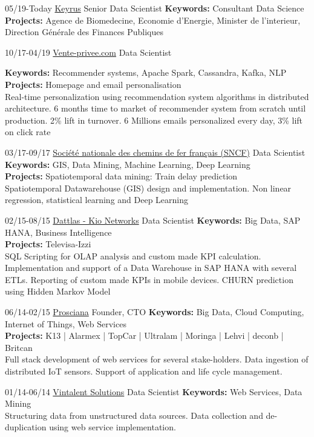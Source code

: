 \documentclass[]{friggeri-cv}
\begin{document}
\begin{entrylist}
\entry
{05/19-Today}
{\href{https://www.keyrus.com/}{Keyrus}}
{Senior Data Scientist} 
{\textbf{Keywords:} Consultant Data Science\\
	\textbf{Projects:} Agence de Biomedecine, Economie d'Energie, Minister de l'interieur, Direction Générale des Finances Publiques
}
	
\entry
{10/17-04/19}
{\href{http://vente-privee.com}{Vente-privee.com}}
{Data Scientist} 
{\textbf{Keywords:} Recommender systems, Apache Spark, Cassandra, Kafka, NLP\\
	\textbf{Projects:} Homepage and email personalisation  \\
	\footnotesize 
	Real-time personalization using recommendation system algorithms in distributed architecture. 6 months time to market of recommender system from scratch until production. 2\% lift in turnover. 6 Millions emails personalized every day, 3\% lift on click rate
	
}	
	
\entry
{03/17-09/17}
{\href{http://www.sncf.com/}{Société nationale des chemins de fer français (SNCF)}}
{Data Scientist} 
{\textbf{Keywords:} GIS, Data Mining, Machine Learning, Deep Learning\\
	\textbf{Projects:} Spatiotemporal data mining: Train delay prediction \\
	\footnotesize 
	Spatiotemporal Datawarehouse (GIS) design and implementation. 
	Non linear regression, statistical learning and Deep Learning 
}

	
	
\entry
{02/15-08/15}
{\href{http://www.dattlas.com}{Dattlas - Kio Networks}}
{Data Scientist} 
{\textbf{Keywords:} Big Data, SAP HANA, Business Intelligence\\
\textbf{Projects:} Televisa-Izzi \\
\footnotesize 
SQL Scripting for OLAP analysis and custom made KPI calculation.
Implementation and support of a Data Warehouse in SAP HANA with several ETLs.
Reporting of custom made KPIs in mobile devices. 
CHURN prediction using Hidden Markov Model
}

\entry
{06/14-02/15}
{\href{http://www.prosciana.com}{Prosciana}}
{Founder, CTO} 
{\textbf{Keywords:} Big Data, Cloud Computing, Internet of Things, Web Services\\
\textbf{Projects:} K13 | Alarmex | TopCar | Ultralam | Moringa | Lehvi | deconb | Britcan\\
\footnotesize 
Full stack development of web services for several stake-holders. Data ingestion of distributed IoT sensors.
Support of application and life cycle management.
}

\entry
{01/14-06/14}
{\href{http://www.vintalent.com}{Vintalent Solutions}}
{Data Scientist}
{\textbf{Keywords:} Web Services, Data Mining\\
	\footnotesize 
	Structuring data from unstructured data sources.
	Data collection and de-duplication using web service implementation.
	}
\end{entrylist}
\end{document}
